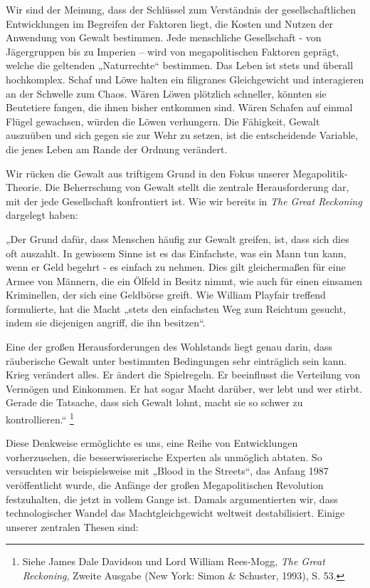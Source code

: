 \documentclass[
  a5paper,
  smalldemyvopaper,10pt,twoside,onecolumn,openright,extrafontsizes,hidelinks]{memoir}
\renewenvironment{quote}%
               {\list{}{\rightmargin=.6cm\leftmargin=.6cm}%
                \itshape \item[]}%
               {\endlist}
\begin{document}
Wir sind der Meinung, dass der Schlüssel zum Verständnis der
gesellschaftlichen Entwicklungen im Begreifen der Faktoren liegt, die
Kosten und Nutzen der Anwendung von Gewalt bestimmen. Jede menschliche
Gesellschaft - von Jägergruppen bis zu Imperien -- wird von
megapolitischen Faktoren geprägt, welche die geltenden „Naturrechte``
bestimmen. Das Leben ist stets und überall hochkomplex. Schaf und Löwe
halten ein filigranes Gleichgewicht und interagieren an der Schwelle zum
Chaos. Wären Löwen plötzlich schneller, könnten sie Beutetiere fangen,
die ihnen bisher entkommen sind. Wären Schafen auf einmal Flügel
gewachsen, würden die Löwen verhungern. Die Fähigkeit, Gewalt auszuüben
und sich gegen sie zur Wehr zu setzen, ist die entscheidende Variable,
die jenes Leben am Rande der Ordnung verändert.

Wir rücken die Gewalt aus triftigem Grund in den Fokus unserer
Megapolitik-Theorie. Die Beherrschung von Gewalt stellt die zentrale
Herausforderung dar, mit der jede Gesellschaft konfrontiert ist. Wie wir
bereits in \emph{The Great Reckoning} dargelegt haben:

\begin{quote}
„Der Grund dafür, dass Menschen häufig zur Gewalt greifen, ist, dass
sich dies oft auszahlt. In gewissem Sinne ist es das Einfachste, was ein
Mann tun kann, wenn er Geld begehrt - es einfach zu nehmen. Dies gilt
gleichermaßen für eine Armee von Männern, die ein Ölfeld in Besitz
nimmt, wie auch für einen einsamen Kriminellen, der sich eine Geldbörse
greift. Wie William Playfair treffend formulierte, hat die Macht „stets
den einfachsten Weg zum Reichtum gesucht, indem sie diejenigen angriff,
die ihn besitzen``.

Eine der großen Herausforderungen des Wohlstands liegt genau darin, dass
räuberische Gewalt unter bestimmten Bedingungen sehr einträglich sein
kann. Krieg verändert alles. Er ändert die Spielregeln. Er beeinflusst
die Verteilung von Vermögen und Einkommen. Er hat sogar Macht darüber,
wer lebt und wer stirbt. Gerade die Tatsache, dass sich Gewalt lohnt,
macht sie so schwer zu kontrollieren.`` \footnote{Siehe James Dale
  Davidson und Lord William Rees-Mogg, \emph{The Great Reckoning},
  Zweite Ausgabe (New York: Simon \& Schuster, 1993), S. 53.}
\end{quote}

Diese Denkweise ermöglichte es uns, eine Reihe von Entwicklungen
vorherzusehen, die besserwisserische Experten als unmöglich abtaten. So
versuchten wir beispielsweise mit „Blood in the Streets``, das Anfang
1987 veröffentlicht wurde, die Anfänge der großen Megapolitischen
Revolution festzuhalten, die jetzt in vollem Gange ist. Damals
argumentierten wir, dass technologischer Wandel das Machtgleichgewicht
weltweit destabilisiert. Einige unserer zentralen Thesen sind:
\end{document}
